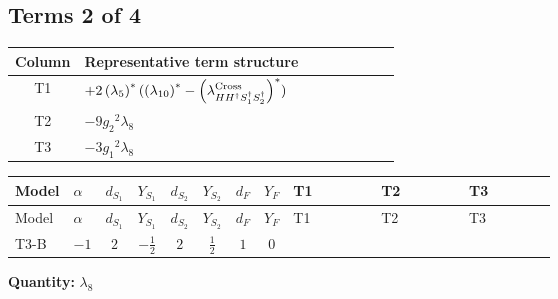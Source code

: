 \documentclass[8pt]{article}
\begin{document}
\begin{landscape}
\subsection*{Terms 2 of 4}
\begin{center}
\begin{tabular}{@{}c >{\raggedright\arraybackslash}p{0.82\linewidth}@{}}
\toprule
Column & Representative term structure \\
\midrule
T1 & \(\displaystyle +2 \left({\lambda_5}\right)^{*} (\left({\lambda_{10}}\right)^{*}-\left({\lambda_{H H^\dagger S_1^\dagger S_2^\dagger}^{\rm Cross}}\right)^{*})\) \\
\midrule
T2 & \(\displaystyle -9 {g_2}^2 {\lambda_{8}}\) \\
\midrule
T3 & \(\displaystyle -3 {g_1}^2 {\lambda_{8}}\) \\
\midrule
\bottomrule
\end{tabular}
\end{center}
\smallskip
\tiny
\begin{longtable}{@{}llcccccc >{\raggedright\arraybackslash}p{0.21\linewidth} >{\raggedright\arraybackslash}p{0.21\linewidth} >{\raggedright\arraybackslash}p{0.21\linewidth}@{}}
\toprule
Model & $\alpha$ & $d_{S_1}$ & $Y_{S_1}$ & $d_{S_2}$ & $Y_{S_2}$ & $d_F$ & $Y_F$ & T1 & T2 & T3 \\
\midrule
\endfirsthead
\toprule
Model & $\alpha$ & $d_{S_1}$ & $Y_{S_1}$ & $d_{S_2}$ & $Y_{S_2}$ & $d_F$ & $Y_F$ & T1 & T2 & T3 \\
\midrule
\endhead
T3-B & $-1$ & $2$ & $-\frac{1}{2}$ & $2$ & $\frac{1}{2}$ & $1$ & $0$ & \scriptsize\adjustbox{max width=\linewidth}{$\begin{gathered} +2 \left({\lambda_5}\right)^{*} (\left({\lambda_{10}}\right)^{*}-\left({\lambda_{H H^\dagger S_1^\dagger S_2^\dagger}^{\rm Cross}}\right)^{*})\end{gathered}$} & \scriptsize\adjustbox{max width=\linewidth}{$\begin{gathered} -9 {g_2}^2 {\lambda_{8}}\end{gathered}$} & \scriptsize\adjustbox{max width=\linewidth}{$\begin{gathered} -3 {g_1}^2 {\lambda_{8}}\end{gathered}$} \\
\midrule
\bottomrule
\end{longtable}
\clearpage
\noindent\textbf{Quantity: }$\lambda_{8}$\par\smallskip

\end{landscape}
\end{document}
